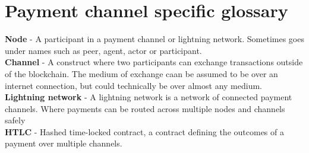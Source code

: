 \documentclass[11pt, titlepage, oneside, a4paper]{report}
\begin{document}
\vspace{-5mm}
\section*{Payment channel specific glossary}\vspace{-5mm}
\textbf{Node} - A participant in a payment channel or lightning network. Sometimes goes under names such as peer, agent, actor or participant.\\
\textbf{Channel} - A construct where two participants can exchange transactions outside of the blockchain. The medium of exchange caan be assumed to be over an internet connection, but could technically be over almost any medium. \\
\textbf{Lightning network} - A lightning network is a network of connected payment channels. Where payments can be routed across multiple nodes and channels safely\\
\textbf{HTLC} - Hashed time-locked contract, a contract defining the outcomes of a payment over multiple channels.\\

\tableofcontents
\thispagestyle{empty}
\newpage
{}
\setcounter{page}{1}
\setcounter{section}{0}















\twocolumn


\onecolumn


\end{document}
